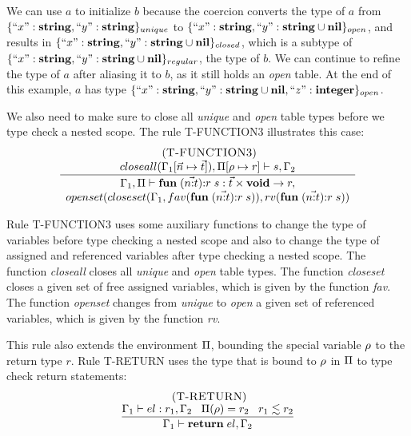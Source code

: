 We can use $a$ to initialize $b$ because the coercion converts
the type of $a$ from $\{``x":\mathbf{string}, ``y":\mathbf{string}\}_{unique}$ to
$\{``x":\mathbf{string}, ``y":\mathbf{string} \cup \mathbf{nil}\}_{open}$, and results in
$\{``x":\mathbf{string}, ``y":\mathbf{string} \cup \mathbf{nil}\}_{closed}$,
which is a subtype of
$\{``x":\mathbf{string}, ``y":\mathbf{string} \cup \mathbf{nil}\}_{regular}$, the type of $b$.
We can continue to refine the type of $a$ after aliasing it to $b$,
as it still holds an \emph{open} table.
At the end of this example, $a$ has type
$\{``x":\mathbf{string}, ``y":\mathbf{string} \cup \mathbf{nil}, ``z":\mathbf{integer}\}_{open}$.

We also need to make sure to close all \emph{unique} and \emph{open}
table types before we type check a nested scope.
The rule \textsc{T-FUNCTION3} illustrates this case:
\[
\begin{array}{c}
\; (\textsc{T-FUNCTION3})\\
\dfrac{closeall(\Gamma_{1}[\vec{n} \mapsto \vec{t}]), \Pi[\rho \mapsto r] \vdash s, \Gamma_{2}}
      {\begin{array}{c}
       \Gamma_{1}, \Pi \vdash \mathbf{fun} \; (\vec{n{:}t}){:}r \; s:\vec{t} \times \mathbf{void} \rightarrow r,\\
       openset(closeset(\Gamma_{1}, fav(\mathbf{fun} \; (\vec{n{:}t}){:}r \; s)),rv(\mathbf{fun} \; (\vec{n{:}t}){:}r \; s))
       \end{array}}
\end{array}
\]

Rule \textsc{T-FUNCTION3} uses some auxiliary functions to change
the type of variables before type checking a nested scope and
also to change the type of assigned and referenced variables after
type checking a nested scope.
The function \emph{closeall} closes all \emph{unique} and \emph{open}
table types.
The function \emph{closeset} closes a given set of free assigned variables,
which is given by the function \emph{fav}.
The function \emph{openset} changes from \emph{unique} to \emph{open}
a given set of referenced variables, which is given by the function \emph{rv}.

This rule also extends the environment $\Pi$, bounding the special
variable $\rho$ to the return type $r$.
Rule \textsc{T-RETURN} uses the type that is bound to $\rho$ in
$\Pi$ to type check return statements:
\[
\begin{array}{c}
\; (\textsc{T-RETURN})\\
\dfrac{\Gamma_{1} \vdash el:r_{1}, \Gamma_{2} \;\;\;
       \Pi(\rho) = r_{2} \;\;\;
       r_{1} \lesssim r_{2}}
      {\Gamma_{1} \vdash \mathbf{return} \; el, \Gamma_{2}}
\end{array}
\]

